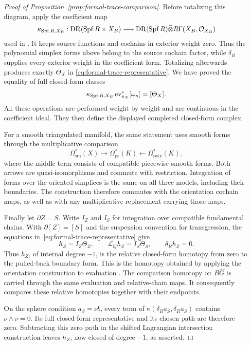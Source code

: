 \begin{proof}[Proof of Proposition~\ref{prop:formal-trace-comparison}]
Before totalizing this diagram, apply the coefficient map
\[
 \kappa_{\operatorname{Spf} R,X_B}:
 \operatorname{DR}(\operatorname{Spf} R\times X_B)
       \longrightarrow
 \operatorname{DR}(\operatorname{Spf} R)\widehat\otimes
                         R\Gamma(X_B,\mathcal O_{X_B})
\]
used in \cite[\S2.1, before Definition~2.3]{PTVV2013}.
It keeps source functions and cochains in exterior weight zero.
Thus the polynomial simplex forms above belong to the source
cochain factor, while \(\delta_R\) supplies every exterior weight
in the coefficient form.  Totalizing afterwards produces
exactly \(\Theta_X\) in
\eqref{eq:formal-trace-representative}.  We have proved the equality
of full closed-form classes
\[
     \kappa_{\operatorname{Spf} R,X_B}
                  \operatorname{ev}_{a_X}^*[\omega_\kappa]
                          =[\Theta_X].
\]
All these operations are performed weight by weight and are
continuous in the coefficient ideal.  They then define the
displayed completed closed-form complex.

For a smooth triangulated manifold, the same statement uses smooth
forms through the multiplicative comparison
\[
 \Omega_{\mathrm{sm}}^*(X)
       \longrightarrow\Omega_{\mathrm{ps}}^*(K)
       \longleftarrow\Omega_{\mathrm{poly}}^*(K),
\]
where the middle term consists of compatible piecewise smooth forms.
Both arrows are quasi-isomorphisms and commute with restriction.
Integration of forms over the oriented simplices is the same on
all three models, including their boundaries.  The construction
therefore commutes with the orientation cochain maps, as well as
with any multiplicative replacement carrying those maps.

Finally let \(\partial Z=S\).  Write \(I_Z\) and \(I_S\) for
integration over compatible fundamental chains.  With
\(\partial[Z]=[S]\) and the suspension convention for transgression,
the equations in~\eqref{eq:formal-trace-representative} give
\[
 h_Z=I_Z\Theta_Z,\qquad
 \mathcal L_Qh_Z=I_S\Theta_S,\qquad \delta_Rh_Z=0.
\]
Thus \(h_Z\), of internal degree \(-1\), is the relative
closed-form homotopy from zero to the pulled-back boundary form.
This is the homotopy obtained by applying the orientation
construction to evaluation
\cite[Definition~2.6 and Claim~2.7]{Calaque2015}.
The comparison homotopy on \(B\widehat G\) is carried through the
same evaluation and relative-chain maps.  It consequently compares
these relative homotopies together with their endpoints.

On the sphere condition \(a_S=\nu b\), every term of
\(\kappa(\delta_Ra_S,\delta_Ra_S)\) contains \(\nu\wedge\nu=0\).
Its full closed-form representative and its chosen path are
therefore zero.  Subtracting this zero path in the shifted
Lagrangian intersection construction leaves \(h_Z\), now closed
of degree \(-1\), as asserted.
\end{proof}
